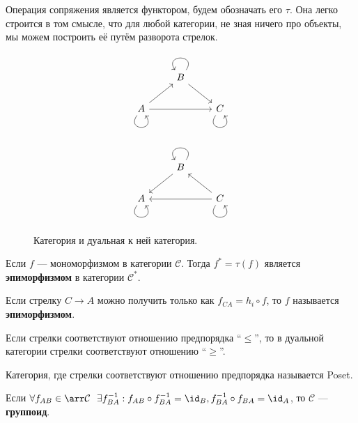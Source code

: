 Операция сопряжения является функтором, будем обозначать его \(\tau\). Она легко строится в том смысле, что для любой категории, не зная ничего про объекты, мы можем построить её путём разворота стрелок.

\begin{example}\itemfix
    \begin{figure}[h!]
        \centering
        \begin{minipage}[b]{0.45\textwidth}
            \centering
            \[\begin{tikzcd}
                    & B \arrow[loop, distance=2em, in=125, out=55, swap]{}\arrow{dr} & \\
                    A \arrow[loop, distance=2em, in=305, out=235, swap]{}\arrow{ur}\arrow{rr} & & C\arrow[loop, distance=2em, in=305, out=235, swap]{} \\
                \end{tikzcd}\]
        \end{minipage}
        \begin{minipage}[b]{0.45\textwidth}
            \centering
            \[\begin{tikzcd}
                    & B \arrow[loop, distance=2em, in=125, out=55, swap]{}\arrow{dl} & \\
                    A \arrow[loop, distance=2em, in=305, out=235, swap]{} & & \arrow[loop, distance=2em, in=305, out=235, swap]{}\arrow{ul}\arrow{ll} C \\
                \end{tikzcd}\]
        \end{minipage}
        \caption{Категория и дуальная к ней категория.}
    \end{figure}
\end{example}

\begin{definition}\itemfix
    Если \(f\) --- мономорфизмом в категории \(\mathcal{C}\). Тогда \(f^* = \tau(f)\) является \textbf{эпиморфизмом} в категории \(\mathcal{C}^*\).
\end{definition}

\begin{definition}[альтернативное]
    Если стрелку \(C \to A\) можно получить только как \(f_{CA} = h_i \circ f\), то \(f\) называется \textbf{эпиморфизмом}.
\end{definition}

\begin{remark}
    Если стрелки соответствуют отношению предпорядка ``\( \leq \)'', то в дуальной категории стрелки соответствуют отношению ``\( \geq \)''.
\end{remark}

\begin{remark}
    Категория, где стрелки соответствуют отношению предпорядка называется Poset.
\end{remark}

\begin{definition}
    Если \(\forall f_{AB} \in \arr \mathcal{C} \ \ \exists f^{-1}_{BA} : f_{AB} \circ f^{-1}_{BA} = \id_B, f^{-1}_{BA} \circ f_{BA} = \id_A\), то \(\mathcal{C}\) --- \textbf{группоид}.
\end{definition}

